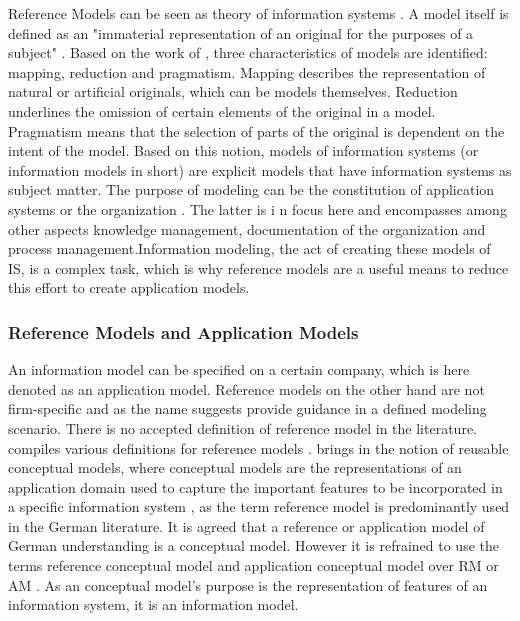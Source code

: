 		
		Reference Models can be seen as theory of information systems \cite{Schutte1998}. A model itself is defined as an "immaterial representation of an original for the purposes of a subject" \citep[]{Becker2012Gom}. Based on the work of \cite{Stachowiak1973}, three characteristics of models are identified: mapping, reduction and pragmatism. Mapping describes the representation of natural or artificial originals, which can be models themselves. Reduction underlines the omission of certain elements of the original in a model. Pragmatism means that the selection of parts of the original is dependent on the intent of the model. Based on this notion, models of information systems (or information models in short) are explicit models that have information systems as subject matter. The purpose of modeling can be the constitution of application systems or the organization \citep[]{Rosemann2012proc}. The latter is i n focus here and encompasses among other aspects knowledge management, documentation of the organization and process management.Information modeling, the act of creating these models of \acrshort{IS}, is a complex task, which is why reference models are a useful means to reduce this effort \cite{Becker2007} to create application models.
		 
			\subsubsection{Reference Models and Application Models}
			An information model can be specified on a certain company, which is here denoted as an application model. Reference models on the other hand are not firm-specific and as the name suggests provide guidance in a defined modeling scenario. There is no accepted definition of reference model in the literature. \citeauthor{thomas2006a} compiles various definitions for reference models \cite{thomas2006a}. \citeauthor{vom2006reusable} brings in the notion of reusable conceptual models, where conceptual models are the representations of an application domain used to capture the important features to be incorporated in a specific information system \citep[]{vom2006reusable}, as the term reference model is predominantly used in the German literature. It is agreed that a reference or application model of German understanding is a conceptual model. However it is refrained to use the terms reference conceptual model and application conceptual model over \acrfull{RM} or \acrfull{AM} . As an conceptual model's purpose is the representation of features of an information system, it is an information model. 
			
